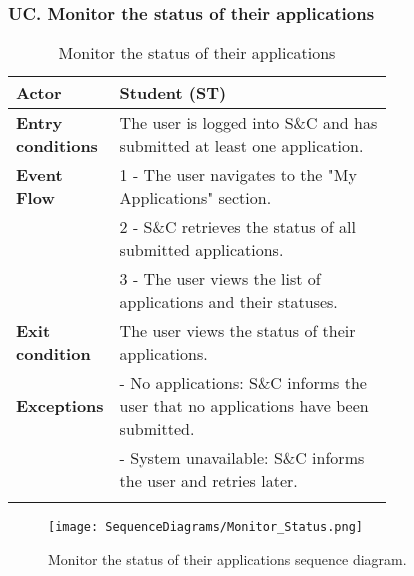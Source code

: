 \subsubsection*{UC\cuc . Monitor the status of their applications}
\begin{center}
    \begin{longtable}{|l|p{0.75\linewidth}|}
        \hline
        \textbf{Actor}            & Student (ST) \\
        \hline
        \textbf{Entry conditions} & The user is logged into S\&C and has submitted at least one application. \\
        \hline
        \textbf{Event Flow}       & 1 - The user navigates to the "My Applications" section. \\
        & 2 - S\&C retrieves the status of all submitted applications. \\
        & 3 - The user views the list of applications and their statuses. \\
        \hline
        \textbf{Exit condition}   & The user views the status of their applications. \\       
        \hline
        \textbf{Exceptions}       & - No applications: S\&C informs the user that no applications have been submitted. \\
                                  & - System unavailable: S\&C informs the user and retries later. \\
        \hline
        \caption{Monitor the status of their applications}
        \label{tab:monitor_status_applications_usecase}
    \end{longtable}
\end{center}

\begin{figure}[H]
    \begin{center}
        \texttt{[image: SequenceDiagrams/Monitor\_Status.png]}
        \caption{Monitor the status of their applications sequence diagram.}
        \label{fig:monitor_status_seqd}%
    \end{center}
\end{figure}

